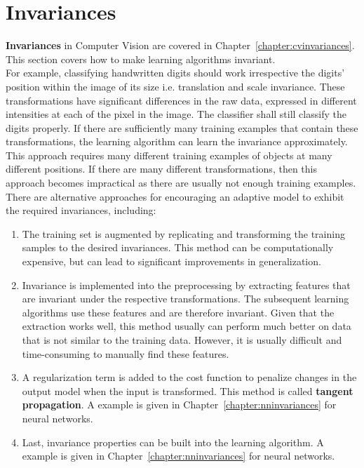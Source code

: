 \documentclass{report}
\begin{document}
\section{Invariances}
\label{chapter:invariances}
{\bf Invariances} in Computer Vision are covered in Chapter~\ref{chapter:cvinvariances}. This section covers how to make learning algorithms invariant. \\
For example, classifying handwritten digits should work irrespective the digits' position within the image of its size i.e. translation and scale invariance.
These transformations have significant differences in the raw data, expressed in different intensities at each of the pixel in the image.
The classifier shall still classify the digits properly.
If there are sufficiently many training examples that contain these transformations, the learning algorithm can learn the invariance approximately.
This approach requires many different training examples of objects at many different positions.
If there are many different transformations, then this approach becomes impractical as there are usually not enough training examples. \\
There are alternative approaches for encouraging an adaptive model to exhibit the required invariances, including:
\begin{enumerate}
\item The training set is augmented by replicating and transforming the training samples to the desired invariances.
This method can be computationally expensive, but can lead to significant improvements in generalization.
\item Invariance is implemented into the preprocessing by extracting features that are invariant under the respective transformations.
The subsequent learning algorithms use these features and are therefore invariant.
Given that the extraction works well, this method usually can perform much better on data that is not similar to the training data.
However, it is usually difficult and time-consuming to manually find these features.
\item A regularization term is added to the cost function to penalize changes in the output model when the input is transformed. This method is called {\bf tangent propagation}.  A example is given in Chapter~\ref{chapter:nninvariances} for neural networks.
\item Last, invariance properties can be built into the learning algorithm. A example is given in Chapter~\ref{chapter:nninvariances} for neural networks.
\end{enumerate}
\end{document}
